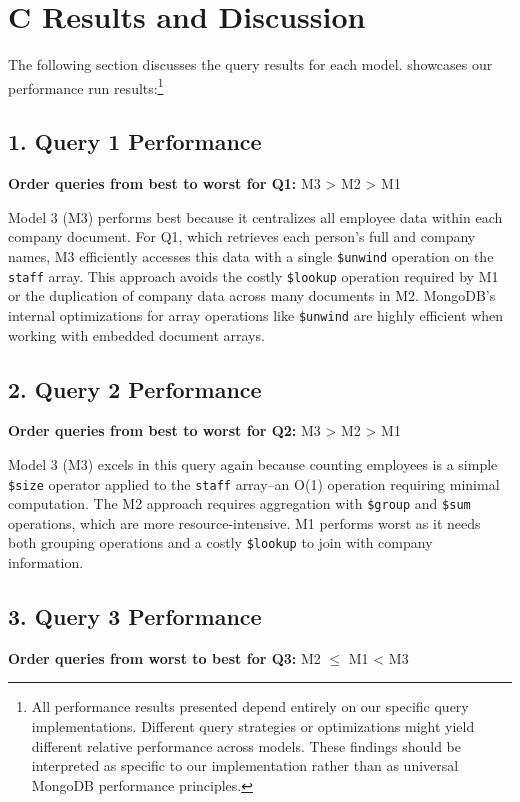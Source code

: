 \section*{C Results and Discussion}

The following section discusses the query results for each model.  showcases our performance run results:\footnote{All performance results presented depend entirely on our specific query implementations. Different query strategies or optimizations might yield different relative performance across models. These findings should be interpreted as specific to our implementation rather than as universal MongoDB performance principles.} 



\subsection*{1. Query 1 Performance}
\textbf{Order queries from best to worst for Q1:} M3 > M2 > M1

Model 3 (M3) performs best because it centralizes all employee data within each company document. For Q1, which retrieves each person's full and company names, M3 efficiently accesses this data with a single \texttt{\$unwind} operation on the \texttt{staff} array. This approach avoids the costly \texttt{\$lookup} operation required by M1 or the duplication of company data across many documents in M2. MongoDB's internal optimizations for array operations like \texttt{\$unwind} are highly efficient when working with embedded document arrays.

\subsection*{2. Query 2 Performance}
\textbf{Order queries from best to worst for Q2:} M3 > M2 > M1

Model 3 (M3) excels in this query again because counting employees is a simple \texttt{\$size} operator applied to the \texttt{staff} array--an O(1) operation requiring minimal computation. The M2 approach requires aggregation with \texttt{\$group} and \texttt{\$sum} operations, which are more resource-intensive. M1 performs worst as it needs both grouping operations and a costly \texttt{\$lookup} to join with company information.

\subsection*{3. Query 3 Performance}
\textbf{Order queries from worst to best for Q3:} M2 $\leq$ M1 < M3

